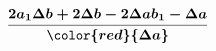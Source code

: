 \documentclass[preview]{standalone}
\begin{document}
\begin{align*}
\boldsymbol{\frac{2a_1\Delta b + 2\Delta b - 2\Delta ab_1 -  \Delta a}{\color{red}{\Delta a}}}
\end{align*}
\end{document}
